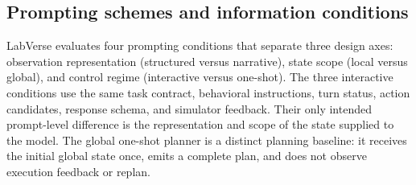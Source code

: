 
\subsection{Prompting schemes and information conditions}
\label{sec:prompting_schemes}

LabVerse evaluates four prompting conditions that separate three design axes:
observation representation (structured versus narrative), state scope (local
versus global), and control regime (interactive versus one-shot). The three
interactive conditions use the same task contract, behavioral instructions,
turn status, action candidates, response schema, and simulator feedback. Their
only intended prompt-level difference is the representation and scope of the
state supplied to the model. The global one-shot planner is a distinct planning
baseline: it receives the initial global state once, emits a complete plan, and
does not observe execution feedback or replan.

